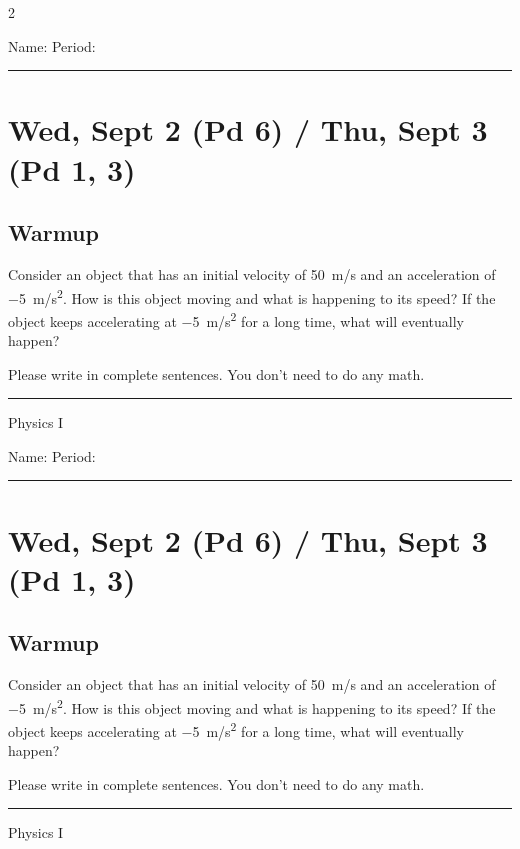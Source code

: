 \documentclass[10pt,landscape]{exam}
\def\todayDate{Wed, Sept 2 (Pd 6) / Thu, Sept 3 (Pd 1, 3)}
\def\content{

Consider an object that has an initial velocity of \SI{+50}{m/s} and an acceleration of \SI{-5}{m/s^2}.  How is this object moving and what is happening to its speed?  If the object keeps accelerating at \SI{-5}{m/s^2} for a long time, what will eventually happen? 

\vspace{1em}

\noindent
{\sc Please write in complete sentences. You don't need to do any math.}

}
\begin{document}
\pagestyle{empty}

\setlength{\columnsep}{0.8in}
\begin{multicols*}{2}

\noindent  
Name: \hfill Period: \hspace{5em}
\vspace{0.5em}
\hrule

\section*{\todayDate}
\subsection*{Warmup}

\content

\vfill
\hrule
\vspace{0.5em}
\hfill {\sc Physics I}

\columnbreak

\noindent  
Name: \hfill Period: \hspace{5em}
\vspace{0.5em}
\hrule

\section*{\todayDate}
\subsection*{Warmup}

\content

\vfill
\hrule
\vspace{0.5em}
\hfill {\sc Physics I}

\end{multicols*}
\end{document}
